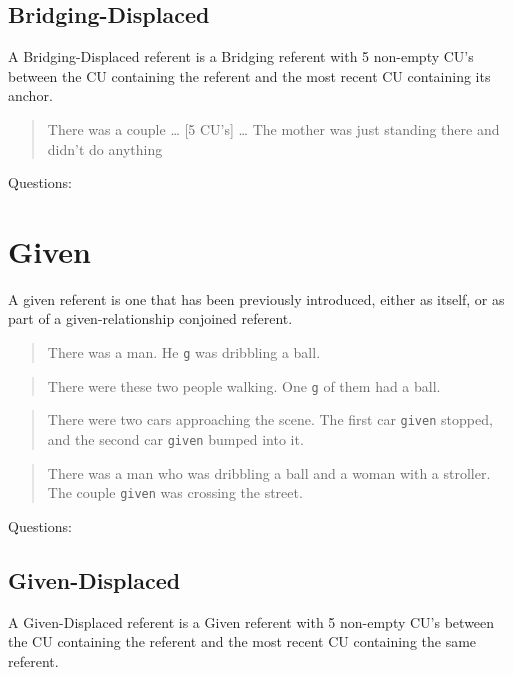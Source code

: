 \documentclass[
]{book}
\begin{document}
\hypertarget{bridging-displaced}{%
\subsection{Bridging-Displaced}\label{bridging-displaced}}

A Bridging-Displaced referent is a Bridging referent with 5 non-empty CU's between the CU containing the referent and the most recent CU containing its anchor.

\begin{quote}
There was a couple \ldots{}
{[}5 CU's{]} \ldots{}
The mother was just standing there and didn't do anything
\end{quote}

Questions:

\hypertarget{given}{%
\section{Given}\label{given}}

A given referent is one that has been previously introduced, either as itself, or as part of a given-relationship conjoined referent.

\begin{quote}
There was a man.
He \texttt{g} was dribbling a ball.
\end{quote}

\begin{quote}
There were these two people walking.
One \texttt{g} of them had a ball.
\end{quote}

\begin{quote}
There were two cars approaching the scene.
The first car \texttt{given} stopped, and the second car \texttt{given} bumped into it.
\end{quote}

\begin{quote}
There was a man who was dribbling a ball and a woman with a stroller.
The couple \texttt{given} was crossing the street.
\end{quote}

Questions:

\hypertarget{given-displaced}{%
\subsection{Given-Displaced}\label{given-displaced}}

A Given-Displaced referent is a Given referent with 5 non-empty CU's between the CU containing the referent and the most recent CU containing the same referent.
\end{document}
